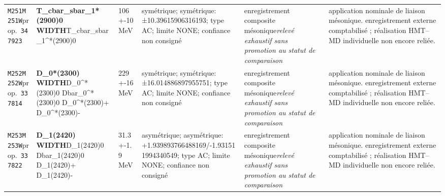 \begin{landscape}
\begin{longtable}{L{1.85cm}L{4.45cm}L{2.35cm}L{4.05cm}L{3.35cm}L{7.15cm}}
\texttt{M251}\newline \texttt{M251W}\newline prop.\ \texttt{347923} & \textbf{T\_\allowbreak{}cbar\_\allowbreak{}sbar\_\allowbreak{}1*(2900)0 WIDTH}\newline T\_\allowbreak{}cbar\_\allowbreak{}sbar\_\allowbreak{}1\textasciicircum{}*(2900)0 & 106+-10\,MeV & symétrique; symétrique: ±10.39615906316193; type AC; limite NONE; confiance non consigné & enregistrement composite mésonique\newline \emph{relevé exhaustif sans promotion au statut de comparaison} & application nominale de liaison mésonique. enregistrement externe comptabilisé ; réalisation HMT--MD individuelle non encore reliée. \\
\texttt{M252}\newline \texttt{M252W}\newline prop.\ \texttt{337814} & \textbf{D\_\allowbreak{}0*(2300) WIDTH}\newline D\_\allowbreak{}0\textasciicircum{}*(2300)0 \textbar{}\allowbreak{} Dbar\_\allowbreak{}0\textasciicircum{}*(2300)0 \textbar{}\allowbreak{} D\_\allowbreak{}0\textasciicircum{}*(2300)+ \textbar{}\allowbreak{} D\_\allowbreak{}0\textasciicircum{}*(2300)- & 229+-16\,MeV & symétrique; symétrique: ±16.014886897955751; type AC; limite NONE; confiance non consigné & enregistrement composite mésonique\newline \emph{relevé exhaustif sans promotion au statut de comparaison} & application nominale de liaison mésonique. enregistrement externe comptabilisé ; réalisation HMT--MD individuelle non encore reliée. \\
\texttt{M253}\newline \texttt{M253W}\newline prop.\ \texttt{337822} & \textbf{D\_\allowbreak{}1(2420) WIDTH}\newline D\_\allowbreak{}1(2420)0 \textbar{}\allowbreak{} Dbar\_\allowbreak{}1(2420)0 \textbar{}\allowbreak{} D\_\allowbreak{}1(2420)+ \textbar{}\allowbreak{} D\_\allowbreak{}1(2420)- & 31.3+-1.9\,MeV & asymétrique; asymétrique: +1.939893766488169/-1.931511994340549; type AC; limite NONE; confiance non consigné & enregistrement composite mésonique\newline \emph{relevé exhaustif sans promotion au statut de comparaison} & application nominale de liaison mésonique. enregistrement externe comptabilisé ; réalisation HMT--MD individuelle non encore reliée. \\

\end{longtable}
\end{landscape}
